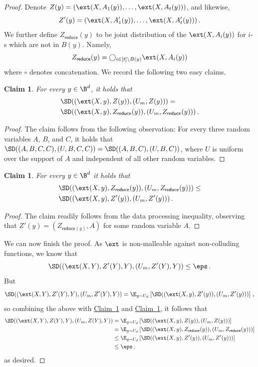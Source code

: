 \documentclass[11pt]{article}
\numberwithin{equation}{section}
\newtheorem{claim}[theorem]{Claim}
\theoremstyle{definition}
\theoremstyle{plain}
\newcommand{\expref}[2]{\hyperref[#2]{#1~\ref{#2}}}
\begin{document}
\begin{proof}
Denote $Z(y) = ( \ext(X,A_{1}(y)),\ldots,\ext(X,A_{t}(y)) )$, and likewise,
\[Z'(y) = ( \ext(X,A'_{1}(y)),\ldots,\ext(X,A'_{t}(y)) )\,.\] We further
define $Z_{\mathsf{reduce}}(y)$ to be joint distribution of the $\ext(X,A_i(y))$ for $i$-s which
are not in $B(y)$. Namely,
\[
Z_{\mathsf{reduce}}(y) = \bigcirc_{i \in [t] \setminus B(y)} \ext(X,A_{i}(y))
\]
where $\circ$ denotes concatenation. 
We record the following two easy claims.
\begin{claim}\label{claim:sec41}
For every $y \in \B^d$,
it holds that
\begin{align*}
&\SD((\ext(X,y),Z(y)),(U_m,Z(y))) =  \\ &\SD((\ext(X,y),Z_{\mathsf{reduce}}(y)),(U_m,Z_{\mathsf{reduce}}(y)))\,.
\end{align*}
\end{claim}
\begin{proof}
The claim follows from the following observation: For every three random variables $A$, $B$, and $C$,
it holds that $\SD((A,B,C,C),(U,B,C,C)) = \SD((A,B,C),(U,B,C))$, where $U$ is uniform over the support of
$A$ and independent of all other random variables.
\end{proof}

\begin{claim}\label{claim:sec42}
For every $y \in \B^d$ it holds that
\begin{align*}
&\SD((\ext(X,y),Z_{\mathsf{reduce}}(y)),(U_m,Z_{\mathsf{reduce}}(y))) \le \\
&\SD((\ext(X,y),Z'(y)),(U_m,Z'(y)))\,.
\end{align*}
\end{claim}
\begin{proof}
The claim readily follows from the data processing inequality, observing that
$Z'(y) = (Z_{\mathsf{reduce}(y)},A)$ for some random variable $A$.
\end{proof}

We can now finish the proof. As $\ext$ is non-malleable against non-colluding functions,
we know that
\[
\SD((\ext(X,Y),Z'(Y),Y),(U_m,Z'(Y),Y)) \le \eps\,.
\]
But
\[
\SD((\ext(X,Y),Z'(Y),Y),(U_m,Z'(Y),Y))  = \E_{y \sim U_d}\left[ \SD((\ext(X,y),Z'(y)),(U_m,Z'(y))) \right]\,,
\]
so
combining the above with \expref{Claim}{claim:sec41} and \expref{Claim}{claim:sec42}, it follows that
\begin{align*}
\SD((\ext(X,Y),Z(Y),Y),(U_m,Z(Y),Y)) &= \E_{y \sim U_d}\left[ \SD((\ext(X,y),Z(y)),(U_m,Z(y))) \right] \\
&= \E_{y \sim U_d}\left[ \SD((\ext(X,y),Z_{\mathsf{reduce}}(y)),(U_m,Z_{\mathsf{reduce}}(y))) \right] \\
&\le \E_{y \sim U_d}\left[ \SD((\ext(X,y),Z'(y)),(U_m,Z'(y))) \right] \\
&\le \eps\,,
\end{align*}
as desired. 
\end{proof}
\end{document}
